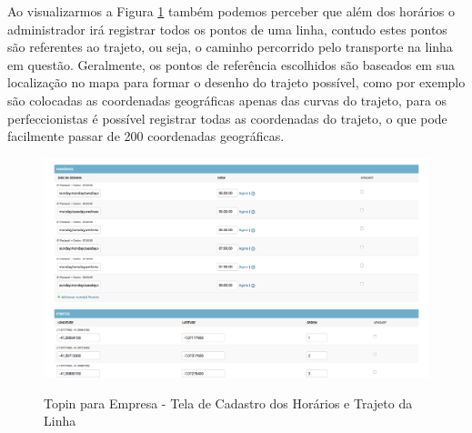 {{{{{{{Ao visualizarmos a Figura \ref{fig:empresa-cadastro-horarios-trajeto} também podemos perceber que além dos horários o administrador irá registrar todos os pontos de uma linha, contudo estes pontos são referentes ao trajeto, ou seja, o caminho percorrido pelo transporte na linha em questão. Geralmente, os pontos de referência escolhidos são baseados em sua localização no mapa para formar o desenho do trajeto possível, como por exemplo são colocadas as coordenadas geográficas apenas das curvas do trajeto, para os perfeccionistas é possível registrar todas as coordenadas do trajeto, o que pode facilmente passar de 200 coordenadas geográficas.

\begin{figure}[H]
\caption{Topin para Empresa - Tela de Cadastro dos Horários e Trajeto da Linha}
\centering
\includegraphics[width=1.0\textwidth]{imagens/cadastro-horarios-pontos.png}
\label{fig:empresa-cadastro-horarios-trajeto}
\end{figure}


}}}}}}}
